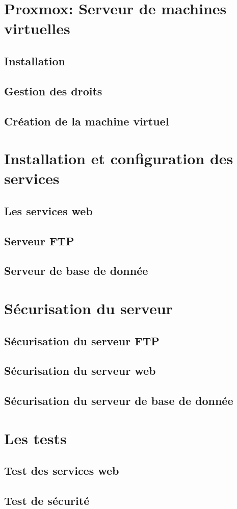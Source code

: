 \documentclass[12pt,a4paper]{article}
\begin{document}
\section{Proxmox: Serveur de machines virtuelles}

\subsection{Installation}
\subsection{Gestion des droits}
\subsection{Création de la machine virtuel}

\section{Installation et configuration des services}
\subsection{Les services web}
\subsection{Serveur FTP}
\subsection{Serveur de base de donnée}

\section{Sécurisation du serveur}
\subsection{Sécurisation du serveur FTP}
\subsection{Sécurisation du serveur web}
\subsection{Sécurisation du serveur de base de donnée}

\section{Les tests}
\subsection{Test des services web}
\subsection{Test de sécurité}
\end{document}
